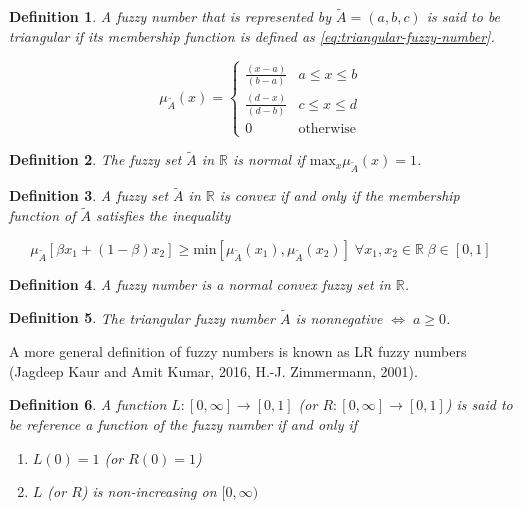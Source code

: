 \documentclass[11pt,a4paper,final]{article}
\newtheorem{definition}{Definition}[section]
\begin{document}
\begin{definition}
A fuzzy number that is represented by \(\tilde{A} = (a,b,c)\) is said to be triangular if its membership function is
defined as \ref{eq:triangular-fuzzy-number}.

\begin{equation}
\label{eq:triangular-fuzzy-number}
  \mu_{\tilde{A}}(x) =
  \begin{cases}
    \frac{(x-a)}{(b-a)} & a \le x \le b \\
    \frac{(d-x)}{(d-b)} & c \le x \le d \\
    0                   & \text{otherwise}
  \end{cases}
\end{equation}
\end{definition}

\begin{definition}
The fuzzy set \(\tilde{A}\) in \(\mathbb{R}\) is normal if \(\text{max}_x \mu_{\tilde{A}}(x) = 1\).
\end{definition}

\begin{definition}
A fuzzy set \(\tilde{A}\) in \(\mathbb{R}\) is convex if and only if the membership function of \(\tilde{A}\) satisfies the inequality

\begin{equation*}
\mu_{\tilde{A}}[\beta x_1 + (1-\beta)x_2] \ge \text{min}[\mu_{\tilde{A}}(x_1), \mu_{\tilde{A}}(x_2)]\; \forall x_1, x_2 \in \mathbb{R}\; \beta \in [0,1]
\end{equation*}
\end{definition}

\begin{definition}
A fuzzy number is a normal convex fuzzy set in \(\mathbb{R}\).
\end{definition}

\begin{definition}
The triangular fuzzy number \(\tilde{A}\) is nonnegative \(\iff\; a \ge 0\).
\end{definition}

A more general definition of fuzzy numbers is known as LR fuzzy numbers
(Jagdeep Kaur and Amit Kumar, 2016, H.-J. Zimmermann, 2001).

\begin{definition}
A function \(L:[0,\infty] \rightarrow [0,1]\) (or \(R:[0,\infty] \rightarrow [0,1]\)) is said to be reference a function of the fuzzy number if and only
if

\begin{enumerate}
\item \(L(0) = 1\) (or \(R(0) = 1\))
\item \(L\) (or \(R\)) is non-increasing on \([0,\infty)\)
\end{enumerate}
\end{definition}
\end{document}
